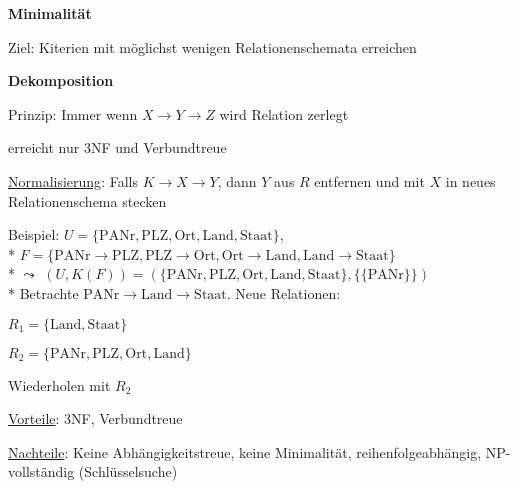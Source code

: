 \textbf{Minimalität}
\begin{items}
	\item Ziel: Kiterien mit möglichst wenigen Relationenschemata erreichen
\end{items}

\textbf{Dekomposition}
\begin{items}
	\item Prinzip: Immer wenn \( X \to Y \to Z \) wird Relation zerlegt
	\item erreicht nur 3NF und Verbundtreue
	\item \underline{Normalisierung}: Falls \( K \to X \to Y \), dann \( Y \) aus \( R \) entfernen und mit \( X \) in neues Relationenschema stecken
	\item Beispiel: \( U = \{ \text{PANr}, \text{PLZ}, \text{Ort}, \text{Land}, \text{Staat} \} \), \\*
	\( F = \{ \text{PANr} \to \text{PLZ}, \text{PLZ} \to \text{Ort}, \text{Ort} \to \text{Land}, \text{Land} \to \text{Staat} \} \) \\*
	\( \leadsto \) \( (U,K(F)) = (\{ \text{PANr}, \text{PLZ}, \text{Ort}, \text{Land}, \text{Staat} \}, \{ \{ \text{PANr} \} \}) \) \\*
	Betrachte \( \text{PANr} \to \text{Land} \to \text{Staat} \). Neue Relationen:
	\begin{enumeration}
		\item \( R_1 = \{ \text{Land}, \text{Staat} \} \)
		\item \( R_2 = \{ \text{PANr}, \text{PLZ}, \text{Ort}, \text{Land} \} \)
	\end{enumeration}
	Wiederholen mit \( R_2 \)
	\item \underline{Vorteile}: 3NF, Verbundtreue
	\item \underline{Nachteile}: Keine Abhängigkeitstreue, keine Minimalität, reihenfolgeabhängig, NP-vollständig (Schlüsselsuche)
\end{items}

\newpage


